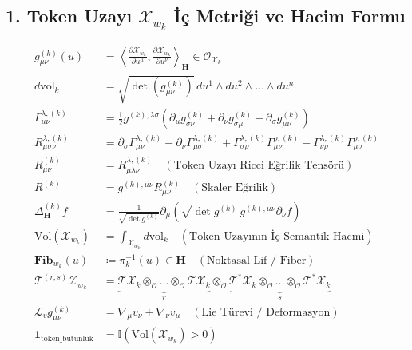 \documentclass[11pt, a4paper]{article}
\begin{document}
\subsection{1. Token Uzayı $\mathcal{X}_{w_k}$ İç Metriği ve Hacim Formu}
\begin{align}
g_{\mu\nu}^{(k)}(u) &= \left\langle \frac{\partial \mathcal{X}_{w_k}}{\partial u^\mu}, \frac{\partial \mathcal{X}_{w_k}}{\partial u^\nu} \right\rangle_{\mathbf{H}} \in \mathcal{O}_{\mathcal{X}_k} \\
d\text{vol}_k &= \sqrt{\det(g_{\mu\nu}^{(k)})} \, du^1 \wedge du^2 \wedge \dots \wedge du^n \\
\Gamma_{\mu\nu}^{\lambda, (k)} &= \frac{1}{2} g^{(k), \lambda \sigma} \left( \partial_\mu g_{\sigma\nu}^{(k)} + \partial_\nu g_{\sigma\mu}^{(k)} - \partial_\sigma g_{\mu\nu}^{(k)} \right) \\
R_{\mu\sigma\nu}^{\lambda, (k)} &= \partial_\sigma \Gamma_{\mu\nu}^{\lambda, (k)} - \partial_\nu \Gamma_{\mu\sigma}^{\lambda, (k)} + \Gamma_{\sigma\rho}^{\lambda, (k)} \Gamma_{\mu\nu}^{\rho, (k)} - \Gamma_{\nu\rho}^{\lambda, (k)} \Gamma_{\mu\sigma}^{\rho, (k)} \\
R_{\mu\nu}^{(k)} &= R_{\mu\lambda\nu}^{\lambda, (k)} \quad (\text{Token Uzayı Ricci Eğrilik Tensörü}) \\
R^{(k)} &= g^{(k), \mu\nu} R_{\mu\nu}^{(k)} \quad (\text{Skaler Eğrilik}) \\
\Delta_{\mathbf{H}}^{(k)} f &= \frac{1}{\sqrt{\det g^{(k)}}} \partial_\mu \left( \sqrt{\det g^{(k)}} \, g^{(k), \mu\nu} \partial_\nu f \right) \\
\text{Vol}(\mathcal{X}_{w_k}) &= \int_{\mathcal{X}_{w_k}} d\text{vol}_k \quad (\text{Token Uzayının İç Semantik Hacmi}) \\
\mathbf{Fib}_{w_k}(u) &\coloneqq \pi_k^{-1}(u) \in \mathbf{H} \quad (\text{Noktasal Lif / Fiber}) \\
\mathcal{T}^{(r,s)} \mathcal{X}_{w_k} &= \underbrace{\mathcal{T}\mathcal{X}_k \otimes_{\mathcal{O}} \dots \otimes_{\mathcal{O}} \mathcal{T}\mathcal{X}_k}_{r} \otimes_{\mathcal{O}} \underbrace{\mathcal{T}^*\mathcal{X}_k \otimes_{\mathcal{O}} \dots \otimes_{\mathcal{O}} \mathcal{T}^*\mathcal{X}_k}_{s} \\
\mathcal{L}_{v} g_{\mu\nu}^{(k)} &= \nabla_\mu v_\nu + \nabla_\nu v_\mu \quad (\text{Lie Türevi / Deformasyon}) \\
\mathbf{1}_{\text{token\_bütünlük}} &= \mathbb{I}\left( \text{Vol}(\mathcal{X}_{w_k}) > 0 \right)
\end{align}
\end{document}
